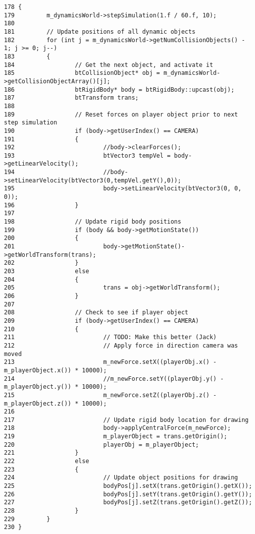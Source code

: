 \begin{Code}\begin{verbatim}178 {
179         m_dynamicsWorld->stepSimulation(1.f / 60.f, 10);
180 
181         // Update positions of all dynamic objects
182         for (int j = m_dynamicsWorld->getNumCollisionObjects() - 1; j >= 0; j--)
183         {
184                 // Get the next object, and activate it
185                 btCollisionObject* obj = m_dynamicsWorld->getCollisionObjectArray()[j];
186                 btRigidBody* body = btRigidBody::upcast(obj);
187                 btTransform trans;
188 
189                 // Reset forces on player object prior to next step simulation
190                 if (body->getUserIndex() == CAMERA)
191                 {
192                         //body->clearForces();
193                         btVector3 tempVel = body->getLinearVelocity();
194                         //body->setLinearVelocity(btVector3(0,tempVel.getY(),0));
195                         body->setLinearVelocity(btVector3(0, 0, 0));
196                 }
197 
198                 // Update rigid body positions
199                 if (body && body->getMotionState())
200                 {
201                         body->getMotionState()->getWorldTransform(trans);
202                 }
203                 else
204                 {
205                         trans = obj->getWorldTransform();
206                 }
207                 
208                 // Check to see if player object
209                 if (body->getUserIndex() == CAMERA)
210                 {
211                         // TODO: Make this better (Jack)
212                         // Apply force in direction camera was moved
213                         m_newForce.setX((playerObj.x() - m_playerObject.x()) * 10000);
214                         //m_newForce.setY((playerObj.y() - m_playerObject.y()) * 10000);
215                         m_newForce.setZ((playerObj.z() - m_playerObject.z()) * 10000);
216 
217                         // Update rigid body location for drawing
218                         body->applyCentralForce(m_newForce);
219                         m_playerObject = trans.getOrigin();
220                         playerObj = m_playerObject;
221                 }
222                 else
223                 {
224                         // Update object positions for drawing
225                         bodyPos[j].setX(trans.getOrigin().getX());
226                         bodyPos[j].setY(trans.getOrigin().getY());
227                         bodyPos[j].setZ(trans.getOrigin().getZ());
228                 }       
229         }
230 }
\end{verbatim}
\end{Code}




